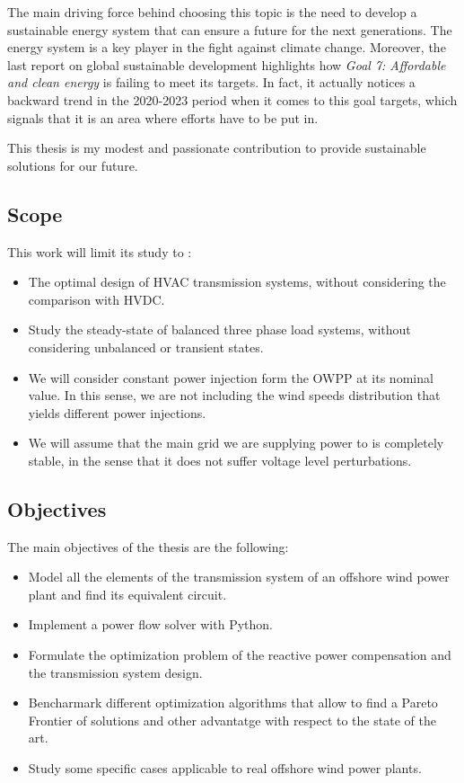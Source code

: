 \documentclass[a4paper,11pt, titlepage, twoside]{article}
\begin{document}
The main driving force behind choosing this topic is the need to develop a sustainable energy system that can
ensure a future for the next generations. The energy system is a key player in the fight against climate change. Moreover, the last
report on global sustainable development \cite{SustGoal7} highlights how \textit{Goal 7: Affordable and clean energy} is failing to meet its targets.
In fact, it actually notices a backward trend in the 2020-2023 period when it comes to this goal targets, which signals that it is an area where efforts
have to be put in. \par

This thesis is my modest and passionate contribution to provide sustainable solutions for our future.

\subsection{Scope}

This work will limit its study to :
\begin{itemize}
    \item The optimal design of HVAC transmission systems, without considering the comparison with HVDC.
    \item Study the steady-state of balanced three phase load systems, without considering unbalanced or transient states.
    \item We will consider constant power injection form the OWPP at its nominal value. In this sense, we are not including the wind speeds distribution that yields different 
    power injections.
    \item We will assume that the main grid we are supplying power to is completely stable, in the sense that it does not suffer voltage level perturbations.
\end{itemize}
\subsection{Objectives}

The main objectives of the thesis are the following:
\begin{itemize}
    \item Model all the elements of the transmission system of an offshore wind power plant and find its equivalent circuit.
    \item Implement a power flow solver with Python.
    \item Formulate the optimization problem of the reactive power compensation and the transmission system design. 
    \item Bencharmark different optimization algorithms that allow to find a Pareto Frontier of solutions and other advantatge with respect to the state of the art.
    \item Study some specific cases applicable to real offshore wind power plants.
  \end{itemize}
\end{document}
